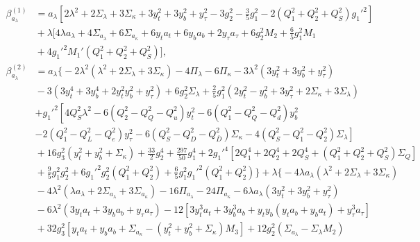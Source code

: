 \documentclass[preprint,amsmath,amssymb,aps,superscriptaddress,prd,showpacs,floatfix,nofootinbib]{revtex4-1}
\begin{document}
\begin{subequations}
\begin{align}
\beta_{a_\lambda}^{(1)}&=a_\lambda \left[2\lambda ^2+2 \Sigma_\lambda +3 \Sigma_\kappa +3 y_t^2+3 y_b^2+y_{\tau }^2-3 g_2^2-\frac{3}{5} g_1^2 -2 \left ( Q_1^2 + Q_2^2 + Q_S^2\right )g_1'^2 \right]\nonumber\\
&{}+\lambda \bigg [ 4\lambda a_\lambda +4\Sigma_{a_\lambda}+6\Sigma_{a_\kappa}+6y_ta_t+6y_ba_b+2y_\tau a_\tau +6g_2^2M_2+\frac{6}{5}g_1^2M_1\nonumber\\
&{}+4g_1'^2M_1'\left ( Q_1^2+Q_2^2+Q_S^2 \right )\bigg ],\label{eq:USSMTLambdaBetaOneLoop}\\
\beta_{a_\lambda}^{(2)}&=a_\lambda \bigg \{ -2\lambda^2\left ( \lambda^2+2\Sigma_\lambda+3\Sigma_\kappa\right )-4\Pi_\lambda-6\Pi_\kappa-3\lambda^2\left ( 3y_t^2+3y_b^2+y_\tau^2\right ) \nonumber\\
&{} -3\left ( 3y_t^4+3y_b^4+2y_t^2y_b^2+y_\tau^2 \right )+6g_2^2\Sigma_\lambda+\frac{2}{5}g_1^2\left ( 2y_t^2-y_b^2+3y_\tau^2+2\Sigma_\kappa +3\Sigma_\lambda\right )\nonumber\\
&{}\left.+g_1'^2\left [ 4Q_S^2\lambda^2 -6\left ( Q_2^2-Q_Q^2-Q_u^2\right )y_t^2-6\left ( Q_1^2-Q_Q^2-Q_d^2\right )y_b^2 \right.\right.\nonumber\\
&{}\left.-2\left ( Q_1^2-Q_L^2-Q_e^2\right )y_\tau^2-6\left ( Q_S^2-Q_D^2-Q_{\overline{D}}^2 \right )\Sigma_\kappa-4\left ( Q_S^2-Q_1^2-Q_2^2\right )\Sigma_\lambda\right ]\nonumber\\
&{}+16g_3^2\left ( y_t^2+y_b^2+\Sigma_\kappa\right ) +\frac{33}{2}g_2^4+\frac{297}{50}g_1^4+2g_1'^4\left [ 2Q_1^4+2Q_2^4+2Q_S^4+\left ( Q_1^2+Q_2^2+Q_S^2\right )\Sigma_{Q}\right ]\nonumber\\
&{}+\frac{9}{5}g_1^2g_2^2+6g_1'^2g_2^2\left ( Q_1^2+Q_2^2\right )+\frac{6}{5}g_1^2g_1'^2\left (Q_1^2+Q_2^2\right )\bigg \}+\lambda \bigg \{ -4\lambda a_\lambda \left ( \lambda^2+2\Sigma_\lambda+3\Sigma_\kappa\right )\nonumber\\
&{}-4\lambda^2\left ( \lambda a_\lambda+2\Sigma_{a_\lambda}+3\Sigma_{a_\kappa}\right )-16\Pi_{a_\lambda}-24\Pi_{a_\kappa}-6\lambda a_\lambda\left ( 3y_t^2+3y_b^2+y_\tau^2\right )\nonumber\\
&{}-6\lambda^2\left ( 3y_ta_t+3y_ba_b+y_\tau a_\tau\right )-12\left [ 3y_t^3a_t+3y_b^3a_b+y_ty_b\left ( y_ta_b+y_ba_t\right )+y_\tau^3 a_\tau\right ]\nonumber\\
&{}+32g_3^2\left [ y_ta_t+y_ba_b+\Sigma_{a_\kappa}-\left ( y_t^2+y_b^2+\Sigma_\kappa\right )M_3\right ]+12g_2^2\left ( \Sigma_{a_\lambda}-\Sigma_\lambda M_2\right )\nonumber\\

\end{align}
\end{subequations}
\end{document}
